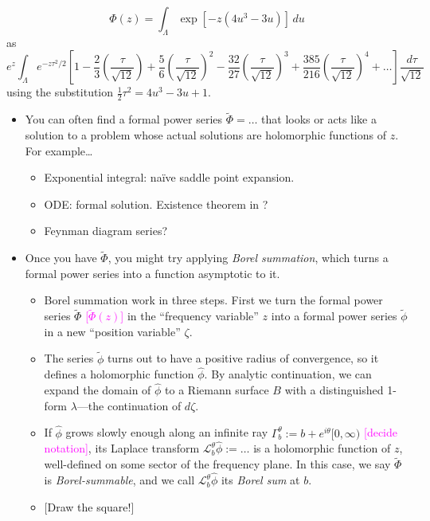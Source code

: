 \documentclass{article}
\newcommand{\laplace}{\mathcal{L}}
\begin{document}
\[ \Phi(z) = \int_{\Lambda} \exp\left[-z \left(4u^3 - 3u\right)\right]\,du \]
as
\[ e^z \int_{\Lambda} e^{-z\tau^2/2} \left[ 1 - \frac{2}{3} \left(\frac{\tau}{\sqrt{12}}\right) + \frac{5}{6} \left(\frac{\tau}{\sqrt{12}}\right)^2 - \frac{32}{27} \left(\frac{\tau}{\sqrt{12}}\right)^3 + \frac{385}{216} \left(\frac{\tau}{\sqrt{12}}\right)^4 + \ldots \right] \frac{d\tau}{\sqrt{12}} \]
using the substitution $\tfrac{1}{2} \tau^2 = 4u^3 - 3u + 1$.
\begin{itemize}
\item You can often find a formal power series $\tilde{\Phi} = \ldots$ that looks or acts like a solution to a problem whose actual solutions are holomorphic functions of $z$. For example\ldots
\begin{itemize}
\item Exponential integral: na\"{i}ve saddle point expansion.
\item ODE: formal solution. Existence theorem in \cite{diverg-resurg-iii}?
\item Feynman diagram series?
\end{itemize}
\item Once you have $\tilde{\Phi}$, you might try applying {\em Borel summation}, which turns a formal power series into a function asymptotic to it.
\begin{itemize}
\item Borel summation work in three steps. First we turn the formal power series $\tilde{\Phi}$ \textcolor{magenta}{[$\tilde{\Phi}(z)$]} in the ``frequency variable'' $z$ into a formal power series $\tilde{\phi}$ in a new ``position variable'' $\zeta$.
\item The series $\tilde{\phi}$ turns out to have a positive radius of convergence, so it defines a holomorphic function $\hat{\phi}$. By analytic continuation, we can expand the domain of $\hat{\phi}$ to a Riemann surface $B$ with a distinguished 1-form $\lambda$---the continuation of $d\zeta$.
\item If $\hat{\phi}$ grows slowly enough along an infinite ray $\Gamma_b^\theta := b + e^{i\theta}[0, \infty)$ \textcolor{magenta}{[decide notation]}, its Laplace transform $\laplace_b^\theta \hat{\phi} := \ldots$ is a holomorphic function of $z$, well-defined on some sector of the frequency plane. In this case, we say $\tilde{\Phi}$ is {\em Borel-summable}, and we call $\laplace_b^\theta \hat{\phi}$ its {\em Borel sum} at $b$.
\item {[Draw the square!]}
\end{itemize}

\end{itemize}
\end{document}
